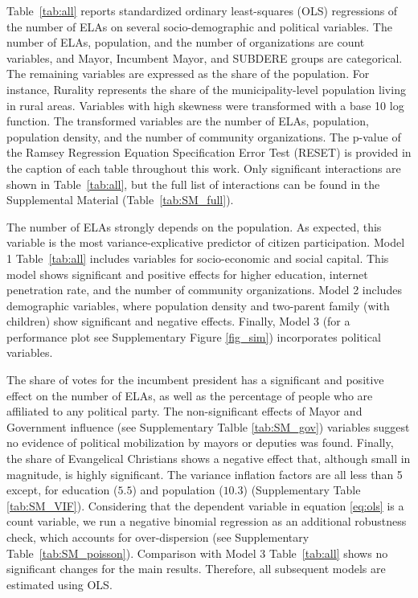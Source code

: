 \documentclass[onecolumn]{article}
\begin{document}
Table~\ref{tab:all} reports standardized ordinary least-squares (OLS) regressions of the number of ELAs on several socio-demographic and political variables. The number of ELAs, population, and the number of organizations are count variables, and Mayor, Incumbent Mayor, and SUBDERE groups are categorical. The remaining variables are expressed as the share of the population. For instance, Rurality represents the share of the municipality-level population living in rural areas. Variables with high skewness were transformed with a base 10 log function. The transformed variables are the number of ELAs, population, population density, and the number of community organizations. The p-value of the Ramsey Regression Equation Specification Error Test (RESET) is provided in the caption of each table throughout this work. Only significant interactions are shown in Table~\ref{tab:all}, but the full list of interactions can be found in the Supplemental Material (Table~\ref{tab:SM_full}). 


The number of ELAs strongly depends on the population. As expected, this variable is the most variance-explicative predictor of citizen participation. Model 1 Table~\ref{tab:all} includes variables for socio-economic and social capital. This model shows significant and positive effects for higher education, internet penetration rate, and the number of community organizations. Model 2 includes demographic variables, where population density and two-parent family (with children) show significant and negative effects. Finally, Model 3 (for a performance plot see Supplementary Figure \ref{fig_sim}) incorporates political variables. 


The share of votes for the incumbent president has a significant and positive effect on the number of ELAs, as well as the percentage of people who are affiliated to any political party. The non-significant effects of Mayor and Government influence (see Supplementary Talble \ref{tab:SM_gov}) variables suggest no evidence of political mobilization by mayors or deputies was found. Finally, the share of Evangelical Christians shows a negative effect that, although small in magnitude, is highly significant. The variance inflation factors are all less than 5 except, for education ($5.5$) and population ($10.3$) (Supplementary Table \ref{tab:SM_VIF}). Considering that the dependent variable in equation \ref{eq:ols} is a count variable, we run a negative binomial regression as an additional robustness check, which accounts for over-dispersion (see Supplementary Table~\ref{tab:SM_poisson}). Comparison with Model 3 Table~\ref{tab:all} shows no significant changes for the main results. Therefore, all subsequent models are estimated using OLS.   
\end{document}
